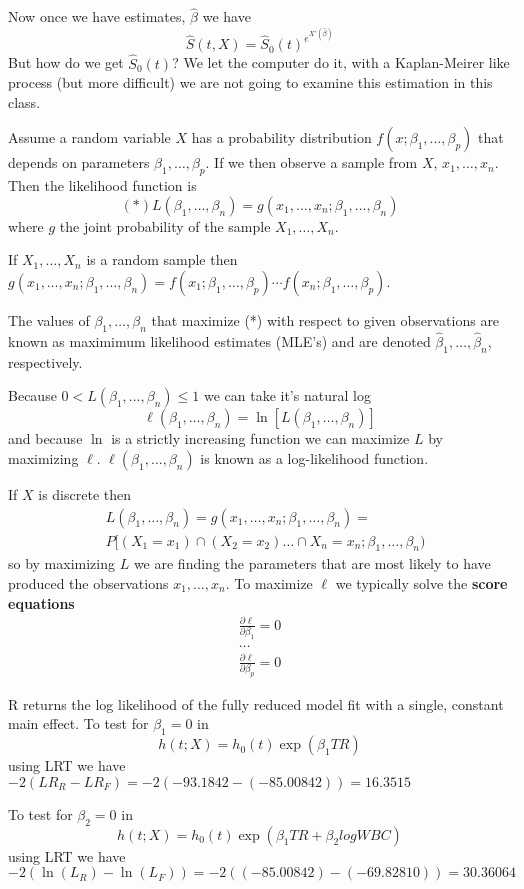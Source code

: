 \documentclass{article}
\begin{document}
Now once we have estimates, $\hat{\beta}$ we have
\[
\hat{S}(t,X) = \hat{S}_0(t)^{e^{X'(\hat{\beta})}}
\]
But how do we get $\hat{S}_0(t)$? We let the computer do it, with a Kaplan-Meirer like process (but more difficult) we are not going to examine this estimation in this class.


Assume a random variable $X$ has a probability distribution $f(x;\beta_1,\ldots,\beta_p)$ that depends on parameters $\beta_1,\ldots,\beta_p$. If we then observe a sample from $X$, $x_1,\ldots,x_n$. Then the likelihood function is
\[
(*) L(\beta_1,\ldots,\beta_n) = g(x_1,\ldots,x_n;\beta_1,\ldots,\beta_n)
\]
where $g$ the joint probability of the sample $X_1,\ldots,X_n$.

If $X_1,\ldots,X_n$ is a random sample then $g(x_1,\ldots,x_n;\beta_1,\ldots,\beta_n) = f(x_1;\beta_1,\ldots,\beta_p) \cdots  f(x_n;\beta_1,\ldots,\beta_p)$.

The values of $\beta_1,\ldots,\beta_n$ that maximize (*) with respect to given observations are known as maximimum likelihood estimates (MLE's) and are denoted $\hat{\beta}_1,\ldots,\hat{\beta}_n$, respectively.

Because $0<L(\beta_1,\ldots,\beta_n) \leq 1$ we can take it's natural log
\[
\ell(\beta_1,\ldots,\beta_n) = \ln[L(\beta_1,\ldots,\beta_n)]
\]
and because $\ln$ is a strictly increasing function we can maximize $L$ by maximizing $\ell$. $\ell(\beta_1,\ldots,\beta_n)$ is known as a log-likelihood function.

If $X$ is discrete then
\begin{align*}
&L(\beta_1,\ldots,\beta_n) = g(x_1,\ldots,x_n;\beta_1,\ldots,\beta_n) = \\
&P[(X_1=x_1) \cap (X_2=x_2) \ldots \cap X_n = x_n;\beta_1,\ldots,\beta_n)
\end{align*}
so by maximizing $L$ we are finding the parameters that are most likely to have produced the observations $x_1,\ldots,x_n$.
To maximize $\ell$ we typically solve the \textbf{score equations}
\begin{align*}
\frac{\partial \ell}{\partial \beta_1}=0 \\
\ldots \\
\frac{\partial \ell}{\partial \beta_p}=0
\end{align*}

R returns the log likelihood of the fully reduced model fit with a single, constant main effect.
To test for $\beta_1=0$ in
\[ h(t;X) = h_0(t)\exp(\beta_1 TR)
\]
using LRT we have $-2(LR_R-LR_F)=-2(-93.1842-(-85.00842)) = 16.3515$


To test for $\beta_2=0$ in
\[
h(t;X) = h_0(t)\exp(\beta_1 TR + \beta_2 logWBC)
\]
using LRT we have $-2(\ln(L_R)-\ln(L_F)) = -2((-85.00842)-(-69.82810))= 30.36064$ 
\end{document}
